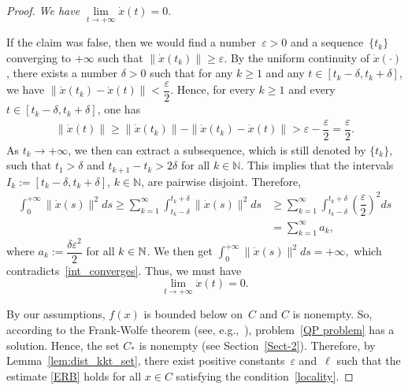 \documentclass[11pt]{article}
\theoremstyle{definition}
\theoremstyle{remark}
\def\disp{\displaystyle}
\def\epsilon{\varepsilon}
\def\N{\Bbb N}
\begin{document}
\begin{proof}
\smallskip
{} \textit{We have $\lim\limits_{t\to +\infty}\dot{x}(t)=0.$}

\smallskip
If the claim was false, then we would find a number~$\varepsilon>0$ and a sequence~$\{t_k\}$ converging to $+\infty$ such that $\|\dot{x}(t_k)\|\geq \varepsilon$. By the uniform continuity of  $\dot{x}(\cdot)$, there exists a number $\delta > 0$  such that for any $k \geq 1$ and any $t \in \left[t_k - \delta, t_k + \delta\right]$, we have $\|\dot{x}(t_k)-\dot{x}(t)\| < \dfrac{\varepsilon}{2}$. Hence, for every $k \geq 1$ and every $t \in \left[t_k - \delta, t_k + \delta\right]$, one has
\begin{align*}
\|\dot{x}(t)\|\geq \|\dot{x}(t_k)\|- \|\dot{x}(t_k)-\dot{x}(t)\|  >  \varepsilon -\dfrac{\varepsilon}{2}
= \dfrac{\varepsilon}{2}.
\end{align*}
 As $t_k\to+\infty$, we then can extract a  subsequence, which is still denoted by $\{t_k\}$, such that $t_1>\delta$ and $t_{k+1} - t_k > 2\delta$ for all $k \in \mathbb{N}$.  This implies that the intervals $I_k := \left[t_k - \delta, t_k + \delta\right]$, $k \in \mathbb{N}$, are pairwise disjoint. Therefore,
\begin{align*}
	\int_{0}^{+\infty} \|\dot{x}(s)\|^2 ds \ge \sum_{k=1}^{\infty} \int_{t_k - \delta}^{t_k + \delta} \|\dot{x}(s)\|^2 ds&\geq \sum_{k=1}^{\infty} \int_{t_k - \delta}^{t_k + \delta} \left(\dfrac{\varepsilon}{2}\right)^2 ds\\
	&=\sum_{k=1}^{\infty} a_k,
\end{align*}
where $a_k:=\dfrac{\delta \epsilon^2}{2}$ for all $k\in\N$. We then get
$\disp\int_{0}^{+\infty}\|\dot{x}(s)\|^2 ds = +\infty,$ which contradicts~\eqref{int_converges}. Thus, we must have
\begin{equation}\label{eq:dotx_to_0}
	\lim_{t\to+\infty}\dot{x}(t)=0.
\end{equation}

	 By our assumptions,  $f(x)$ is bounded below on~$C$ and $C$ is nonempty. So, according to the Frank-Wolfe theorem (see, e.g.,~\cite[Theorem~2.1]{lty05}), problem~\eqref{QP problem} has a solution. Hence, the set $C_*$ is nonempty (see Section~\ref{Sect-2}). Therefore, by Lemma~\ref{lem:dist_kkt_set}, there exist positive constants~$\varepsilon$ and~$\ell$ such that the estimate \eqref{ERB} holds for all $x\in C$ satisfying the condition~\eqref{locality}. 
	 

\end{proof}
\end{document}
